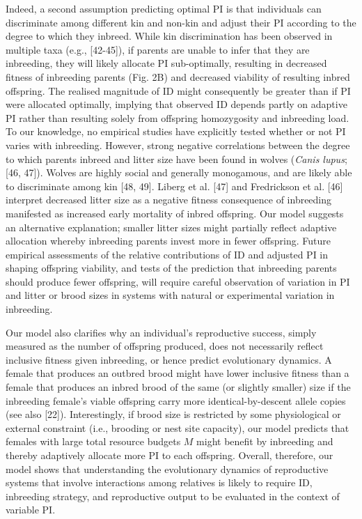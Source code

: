 \documentclass[12pt]{article}
\begin{document}
Indeed, a second assumption predicting optimal PI is that individuals can discriminate among different kin and non-kin and adjust their PI according to the degree to which they inbreed. While kin discrimination has been observed in multiple taxa (e.g., [42-45]), if parents are unable to infer that they are inbreeding, they will likely allocate PI sub-optimally, resulting in decreased fitness of inbreeding parents (Fig. 2B) and decreased viability of resulting inbred offspring. The realised magnitude of ID might consequently be greater than if PI were allocated optimally, implying that observed ID depends partly on adaptive PI rather than resulting solely from offspring homozygosity and inbreeding load. To our knowledge, no empirical studies have explicitly tested whether or not PI varies with inbreeding. However, strong negative correlations between the degree to which parents inbreed and litter size have been found in wolves (\textit{Canis lupus}; [46, 47]). Wolves are highly social and generally monogamous, and are likely able to discriminate among kin [48, 49]. Liberg et al. [47] and Fredrickson et al. [46] interpret decreased litter size as a negative fitness consequence of inbreeding manifested as increased early mortality of inbred offspring. Our model suggests an alternative explanation; smaller litter sizes might partially reflect adaptive allocation whereby inbreeding parents invest more in fewer offspring. Future empirical assessments of the relative contributions of ID and adjusted PI in shaping offspring viability, and tests of the prediction that inbreeding parents should produce fewer offspring, will require careful observation of variation in PI and litter or brood sizes in systems with natural or experimental variation in inbreeding.

Our model also clarifies why an individual's reproductive success, simply measured as the number of offspring produced, does not necessarily reflect inclusive fitness given inbreeding, or hence predict evolutionary dynamics. A female that produces an outbred brood might have lower inclusive fitness than a female that produces an inbred brood of the same (or slightly smaller) size if the inbreeding female's viable offspring carry more identical-by-descent allele copies (see also [22]). Interestingly, if brood size is restricted by some physiological or external constraint (i.e., brooding or nest site capacity), our model predicts that females with large total resource budgets $M$ might benefit by inbreeding and thereby adaptively allocate more PI to each offspring. Overall, therefore, our model shows that understanding the evolutionary dynamics of reproductive systems that involve interactions among relatives is likely to require ID, inbreeding strategy, and reproductive output to be evaluated in the context of variable PI.
\end{document}

